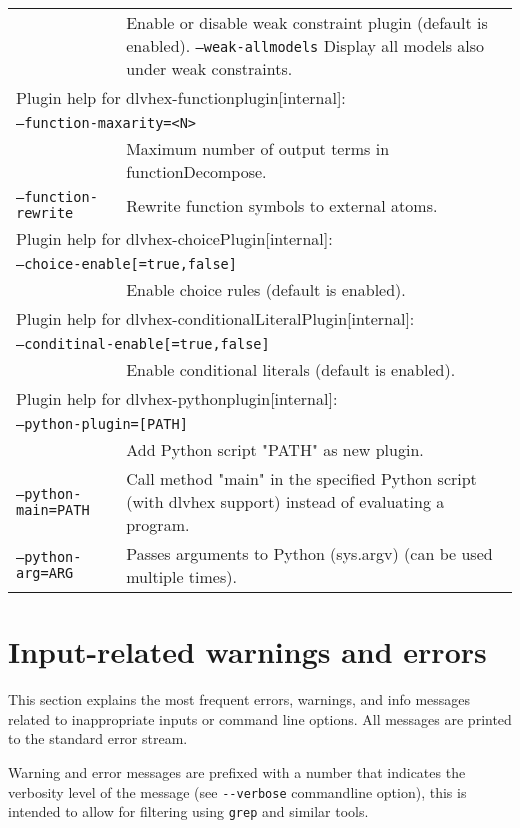 \documentclass[a4paper, titlepage]{article}
\begin{document}
\begin{longtable}{ p{2.0em} p{2.2cm} p{0.6cm} p{8.0cm} }
& & & Enable or disable weak constraint plugin (default is enabled). \texttt{--weak-allmodels} Display all models also under weak constraints.\\ 
\multicolumn{4}{l}{Plugin help for dlvhex-functionplugin[internal]:}\\
\multicolumn{4}{l}{\texttt{--function-maxarity=<N>}}\\
& & & Maximum number of output terms in functionDecompose.\\ 
\multicolumn{3}{l}{\texttt{--function-rewrite}} &
  Rewrite function symbols to external atoms.\\ 
\multicolumn{4}{l}{Plugin help for dlvhex-choicePlugin[internal]:}\\
\multicolumn{4}{l}{\texttt{--choice-enable[=true,false]}}\\
& & & Enable choice rules (default is enabled).\\
\multicolumn{4}{l}{Plugin help for dlvhex-conditionalLiteralPlugin[internal]:}\\
\multicolumn{4}{l}{\texttt{--conditinal-enable[=true,false]}}\\
& & & Enable conditional literals (default is enabled).\\
\multicolumn{4}{l}{Plugin help for dlvhex-pythonplugin[internal]:}\\
\multicolumn{4}{l}{\texttt{--python-plugin=[PATH]}}\\
& & & Add Python script "PATH" as new plugin.\\
\multicolumn{3}{l}{\texttt{--python-main=PATH}} &
   Call method "main" in the specified Python script (with dlvhex support) instead of evaluating a program.\\
\multicolumn{3}{l}{\texttt{--python-arg=ARG}} &
  Passes arguments to Python (sys.argv) (can be used multiple times).\\
\end{longtable}

\section{Input-related warnings and errors}
\label{sec:inputRelatedWarnings}
This section explains the most frequent errors, warnings, and info messages related
to inappropriate inputs or command line options. All messages are printed to the
standard error stream.

Warning and error messages are prefixed with a number
that indicates the verbosity level of the message
(see \verb|--verbose| commandline option),
this is intended to allow for filtering
using \verb|grep| and similar tools.
\end{document}
